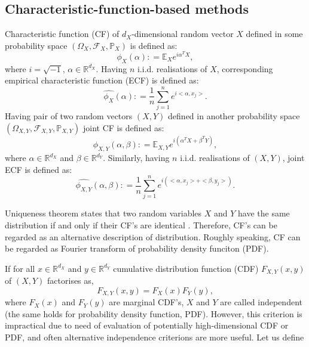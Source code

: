 \documentclass{article}
\begin{document}
\subsection{Characteristic-function-based methods}
\label{section:previous_work_cf}
Characteristic function (CF) of $d_{X}$-dimensional random vector $X$ defined in some probability space $(\Omega_{X}, \mathcal{F}_{X}, \mathbb{P}_{X})$ is defined as: 
\begin{equation}
\label{eq:characteristic_function}
\phi_{X}(\alpha): = \mathbb{E}_{X} e^{i\alpha^{T}X}, 
\end{equation}
where $i=\sqrt{-1}$, $\alpha \in \mathbb{R}^{d_{X}}$. Having $n$ i.i.d. realisations of $X$, corresponding empirical characteristic function (ECF) is defined as:
\begin{equation}
\label{eq:ecf}
\widehat{\phi_{X}}(\alpha): = \frac{1}{n} \sum_{j=1}^{n} e^{i <\alpha, x_{j}>}.
\end{equation}
Having pair of two random vectors $(X,Y)$ defined in another probability space $(\Omega_{X,Y}, \mathcal{F}_{X,Y}, \mathbb{P}_{X,Y})$  joint CF is defined as:
\begin{equation}
\label{eq:joint_characteristic_function}
\phi_{X,Y}(\alpha,\beta): = \mathbb{E}_{X,Y} e^{i(\alpha^{T}X + \beta^{T}Y)},
\end{equation}
where $\alpha \in \mathbb{R}^{d_{X}}$ and $\beta \in \mathbb{R}^{d_{Y}}$. Similarly, having 
$n$ i.i.d. realisations of $(X,Y)$, joint ECF is defined as:
\begin{equation}
\label{eq:joint_ecf}
\widehat{\phi_{X,Y}}(\alpha,\beta): = \frac{1}{n} \sum_{j=1}^{n} e^{i(<\alpha, x_{j}> + <\beta, y_{j}>) }.
\end{equation}


Uniqueness theorem states that two random variables $X$ and $Y$ have the same distribution if and only if their CF's are identical \cite{?}. Therefore, CF's can be regarded as an alternative description of distribution. Roughly speaking, CF can be regarded as Fourier transform of probability density funciton (PDF).

If for all $x \in \mathbb{R}^{d_{X}}$ and $y \in \mathbb{R}^{d_{Y}}$ cumulative distribution function (CDF) $F_{X,Y}(x,y)$ of $(X,Y)$ factorises as, 
\begin{equation}
\label{eq:independence}
F_{X,Y}(x,y) = F_{X}(x)F_{Y}(y),
\end{equation} 
where $F_{X}(x)$ and $F_{Y}(y)$ are marginal CDF's, $X$ and $Y$ are called independent (the same holds for probability density function, PDF). However, this criterion is impractical due to need of evaluation of potentially high-dimensional CDF or PDF, and often alternative independence criterions are more useful. Let us define 
\end{document}
